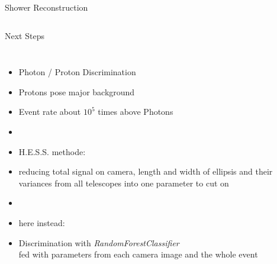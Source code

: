 \documentclass[8pt]{beamer}
\begin{document}
\begin{frame}{Shower Reconstruction}
\begin{columns}
        \end{columns}

    \end{frame}



    \begin{frame}{Next Steps}
        \begin{columns}

                \begin{itemize}
                    \item [] Photon / Proton Discrimination
                    \item Protons pose major background
                    \item Event rate about $10^5$ times above Photons
                    \item[]
                    \item[] H.E.S.S. methode:
                    \item reducing total signal on camera, length and width
                        of ellipsis and their variances from all telescopes
                        into one parameter to cut on
                    \item[]
                    \item[] here instead:
                    \item Discrimination with \emph{RandomForestClassifier}\\
                        fed with parameters from each camera image and the whole event
                \end{itemize}
                \centering
\end{columns}
\end{frame}
\end{document}
